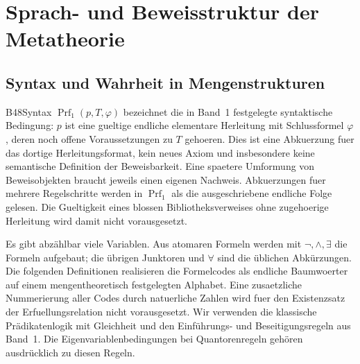 \chapter{Sprach- und Beweisstruktur der Metatheorie}

\section{Syntax und Wahrheit in Mengenstrukturen}

{B48Syntax}{
}
\noindent
\(\operatorname{Prf}_{1}(p,T,\varphi)\) bezeichnet die in Band~1
festgelegte syntaktische Bedingung: \(p\) ist eine gueltige endliche
elementare Herleitung mit Schlussformel \(\varphi\), deren noch offene
Voraussetzungen zu \(T\) gehoeren. Dies ist eine Abkuerzung fuer
das dortige Herleitungsformat, kein neues Axiom und insbesondere
keine semantische Definition der Beweisbarkeit. Eine spaetere
Umformung von Beweisobjekten braucht jeweils einen eigenen Nachweis.
Abkuerzungen fuer mehrere Regelschritte werden in
\(\operatorname{Prf}_1\) als die ausgeschriebene endliche Folge
gelesen. Die Gueltigkeit eines blossen Bibliotheksverweises ohne
zugehoerige Herleitung wird damit nicht vorausgesetzt.

Es gibt abzählbar viele Variablen. Aus atomaren Formeln werden mit
\(\neg,\land,\exists\) die Formeln aufgebaut; die übrigen Junktoren und
\(\forall\) sind die üblichen Abkürzungen.
Die folgenden Definitionen realisieren die Formelcodes als endliche
Baumwoerter auf einem mengentheoretisch festgelegten Alphabet.
Eine zusaetzliche Nummerierung aller Codes durch natuerliche Zahlen
wird fuer den Existenzsatz der Erfuellungsrelation nicht vorausgesetzt.
Wir verwenden die klassische Prädikatenlogik mit Gleichheit und den
Einführungs- und Beseitigungsregeln aus Band~1. Die Eigenvariablenbedingungen
bei Quantorenregeln gehören ausdrücklich zu diesen Regeln.





